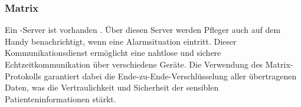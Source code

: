 \subsubsection{Matrix}
Ein -Server ist vorhanden \cite{Matrix}. Über diesen Server werden Pfleger auch auf dem Handy benachrichtigt, wenn eine Alarmsituation eintritt. Dieser Kommunikationsdienst ermöglicht eine nahtlose und sichere Echtzeitkommunikation über verschiedene Geräte. Die Verwendung des Matrix-Protokolls garantiert dabei die Ende-zu-Ende-Verschlüsselung aller übertragenen Daten, was die Vertraulichkeit und Sicherheit der sensiblen Patienteninformationen stärkt.

